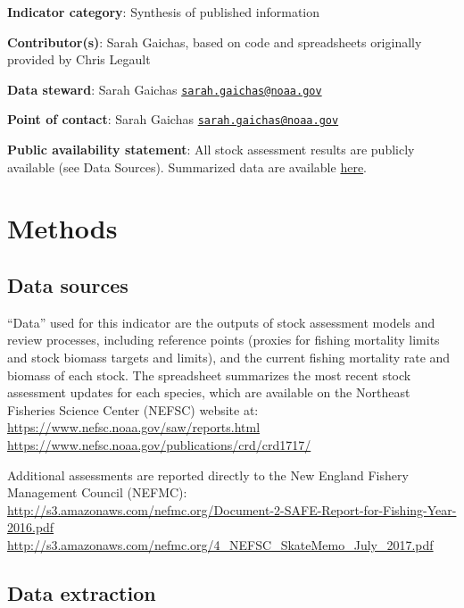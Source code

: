 \documentclass[
]{book}
\begin{document}
\textbf{Indicator category}: Synthesis of published information

\textbf{Contributor(s)}: Sarah Gaichas, based on code and spreadsheets originally provided by Chris Legault

\textbf{Data steward}: Sarah Gaichas \href{mailto:sarah.gaichas@noaa.gov}{\nolinkurl{sarah.gaichas@noaa.gov}}

\textbf{Point of contact}: Sarah Gaichas \href{mailto:sarah.gaichas@noaa.gov}{\nolinkurl{sarah.gaichas@noaa.gov}}

\textbf{Public availability statement}: All stock assessment results are publicly available (see Data Sources). Summarized data are available \href{http://comet.nefsc.noaa.gov/erddap/tabledap/assess_soe_v1.htmlTable?No,Entity_Name,Science_Center,Assessment_Year,Last_Data_Year,Assessment_Level,Citation,Comments,Best_F,F_Year,Flimit,Fmsy,F_Flimit,F_Fmsy,Best_B,B_Year,B_Blimit,B_Bmsy,Stock_Level_Relative_to_Bmsy,Bmsy,Blim}{here}.

\hypertarget{methods-36}{%
\section{Methods}\label{methods-36}}

\hypertarget{data-sources-36}{%
\subsection{Data sources}\label{data-sources-36}}

``Data'' used for this indicator are the outputs of stock assessment models and review processes, including reference points (proxies for fishing mortality limits and stock biomass targets and limits), and the current fishing mortality rate and biomass of each stock. The spreadsheet summarizes the most recent stock assessment updates for each species, which are available on the Northeast Fisheries Science Center (NEFSC) website at:
\url{https://www.nefsc.noaa.gov/saw/reports.html}\\
\url{https://www.nefsc.noaa.gov/publications/crd/crd1717/}

Additional assessments are reported directly to the New England Fishery Management Council (NEFMC):
\url{http://s3.amazonaws.com/nefmc.org/Document-2-SAFE-Report-for-Fishing-Year-2016.pdf}\\
\url{http://s3.amazonaws.com/nefmc.org/4_NEFSC_SkateMemo_July_2017.pdf}

\hypertarget{data-extraction-29}{%
\subsection{Data extraction}\label{data-extraction-29}}
\end{document}
